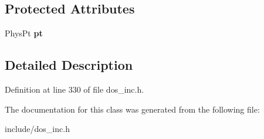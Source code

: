 \subsection*{Protected Attributes}
\begin{DoxyCompactItemize}
\item 
\hypertarget{classMemStruct_acac6123c566805e45fb8ff9e7744d3e2}{Phys\-Pt {\bfseries pt}}\label{classMemStruct_acac6123c566805e45fb8ff9e7744d3e2}

\end{DoxyCompactItemize}


\subsection{Detailed Description}


Definition at line 330 of file dos\-\_\-inc.\-h.



The documentation for this class was generated from the following file\-:\begin{DoxyCompactItemize}
\item 
include/dos\-\_\-inc.\-h\end{DoxyCompactItemize}

